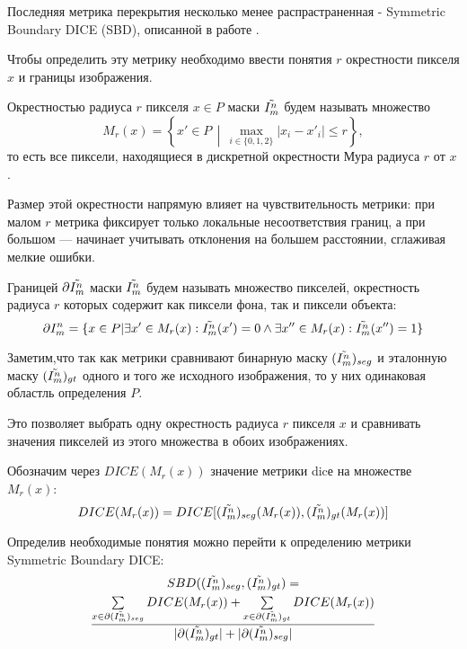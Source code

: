 Последняя метрика перекрытия несколько менее распрастраненная - Symmetric Boundary DICE (SBD), описанной в работе \cite{yeghiazaryan2018family}.

Чтобы определить эту метрику необходимо ввести понятия \(r\) окрестности пикселя \(x\) и границы изображения.

Окрестностью радиуса \(r\) пикселя \(x \in P\) маски \(\tilde{I^n_m}\) будем называть множество
\begin{equation}\label{eq:neighborhood}
    M_r(x) = \left\{ x' \in P \,\middle|\, \max_{i \in \{0,1,2\}} |x_i - x'_i| \leq r \right\},
\end{equation}
то есть все пиксели, находящиеся в дискретной окрестности Мура радиуса \(r\) от \(x\).

Размер этой окрестности напрямую влияет на чувствительность метрики: при малом  \(r\) метрика фиксирует только локальные несоответствия границ, а при большом — начинает учитывать отклонения на большем расстоянии, сглаживая мелкие ошибки.

Границей \(\partial \tilde{I^n_m} \) маски \(\tilde{I^n_m} \) будем называть множество пикселей, окрестность радиуса \(r\) которых содержит как пиксели фона, так и пиксели объекта:
\begin{equation}\label{eq:boundary}
    \partial I^n_m = \{ x \in P | \exists x' \in M_r(x) : \tilde{I^n_m}(x') = 0 \land  \exists x'' \in M_r(x) : \tilde{I^n_m}(x'') = 1 \}
\end{equation}

Заметим,что так как метрики сравнивают бинарную маску \((\tilde{I^n_m})_{seg}\) и эталонную маску \((\tilde{I^n_m})_{gt}\) одного и того же исходного изображения, то у них одинаковая областль определения \(P\). 

Это позволяет выбрать одну окрестность радиуса \(r\) пикселя \(x\) и сравнивать значения пикселей из этого множества в обоих изображениях.

Обозначим через \(DICE(M_r(x))\) значение метрики dicе на множестве \(M_r(x)\): 
\begin{equation}
    DICE(M_r(x)) = DICE[(\tilde{I^n_m})_{seg}(M_r(x)), (\tilde{I^n_m})_{gt}(M_r(x))]
\end{equation}

Определив необходимые понятия можно перейти к определению метрики Symmetric Boundary DICE:
\begin{multline}\label{eq:SBD}
    SBD((\tilde{I^n_m})_{seg}, (\tilde{I^n_m})_{gt}) = \\
    \frac{
        \sum\limits_{x \in \partial (\tilde{I^n_m})_{seg}} DICE(M_r(x)) 
        + \sum\limits_{x \in \partial (\tilde{I^n_m})_{gt}} DICE(M_r(x))
    }{
        |\partial (\tilde{I^n_m})_{gt}| + |\partial (\tilde{I^n_m})_{seg}|
    }
\end{multline}

